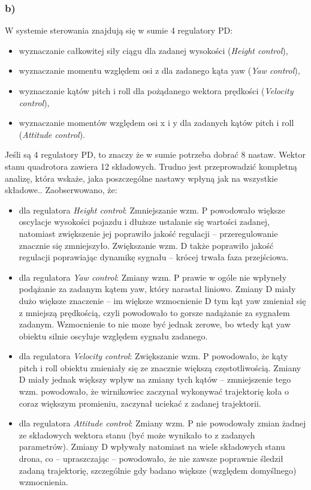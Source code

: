 \documentclass[11pt, a4paper]{article}
\begin{document}
\subsubsection*{b)}

W systemie sterowania znajdują się w sumie 4 regulatory PD:
\begin{itemize}
\item wyznaczanie całkowitej siły ciągu dla zadanej wysokości (\emph{Height control}),
\item wyznaczanie momentu względem osi z dla zadanego kąta yaw (\emph{Yaw control}),
\item wyznaczanie kątów pitch i roll dla pożądanego wektora prędkości (\emph{Velocity control}),
\item wyznaczanie momentów względem osi x i y dla zadanych kątów pitch i roll (\emph{Attitude control}).
\end{itemize}

Jeśli są 4 regulatory PD, to znaczy że w sumie potrzeba dobrać 8 nastaw. Wektor stanu quadrotora zawiera 12 składowych. Trudno jest przeprowadzić kompletną analizę, która wskaże, jaka poszczególne nastawy wpłyną jak na wszystkie składowe..
Zaobserwowano, że:
\begin{itemize}
\item dla regulatora \emph{Height control}: \hspace{0.2cm}
Zmniejszanie wzm. P powodowało większe oscylacje wysokości pojazdu i dłuższe ustalanie się wartości zadanej, natomiast zwiększenie jej poprawiło jakość regulacji -- przeregulowanie znacznie się zmniejszyło. Zwiększanie wzm. D także poprawiło jakość regulacji poprawiając dynamikę sygnału -- krócej trwała faza przejściowa.
\item dla regulatora \emph{Yaw control}: \hspace{0.2cm}
Zmiany wzm. P prawie w ogóle nie wpłyneły podążanie za zadanym kątem yaw, który narastał liniowo. Zmiany D miały dużo większe znaczenie -- im większe wzmocnienie D tym kąt yaw zmieniał się z mniejszą prędkością, czyli powodowało to gorsze nadążanie za sygnałem zadanym. Wzmocnienie to nie moze być jednak zerowe, bo wtedy kąt yaw obiektu silnie oscyluje względem sygnału zadanego.
\item dla regulatora \emph{Velocity control}: \hspace{0.2cm}
Zwiększanie wzm. P powodowało, że kąty pitch i roll obiektu zmieniały się ze znacznie większą częstotliwością. Zmiany D miały jednak większy wpływ na zmiany tych kątów -- zmniejszenie tego wzm. powodowało, że wirnikowiec zaczynał wykonywać trajektorię koła o coraz większym promieniu, zaczynał uciekać z zadanej trajektorii.
\item dla regulatora \emph{Attitude control}: \hspace{0.2cm}
Zmiany wzm. P nie powodowały zmian żadnej ze składowych wektora stanu (być może wynikało to z zadanych parametrów). Zmiany D wpływały natomiast na wiele składowych stanu drona, co -- upraszczając -- powodowało, że nie zawsze poprawnie śledził zadaną trajektorię, szczególnie gdy badano większe (względem domyślnego) wzmocnienia.
\end{itemize}
\end{document}
